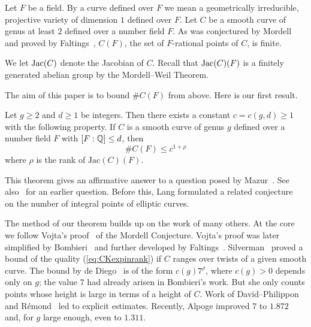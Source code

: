 Let $F$ be a field. By a curve defined over $F$ we mean a geometrically
irreducible, projective variety of dimension $1$ defined over $F$. Let $C$ be
a smooth curve of genus at least $2$ defined over a number field $F$. As was
conjectured by Mordell and proved by Faltings~\cite{Faltings:ES},
$C(F)$, the set of $F$-rational points of $C$, is finite.

We let $\mathrm{Jac}(C)$ denote the Jacobian of $C$. Recall
that $\mathrm{Jac}(C)(F)$ is a finitely generated abelian group by the
Mordell--Weil Theorem. 

The aim of this paper is to bound $\# C(F)$ from above. Here is our
first result. 

\begin{theorem}\label{ThmBdRatIntro}
  Let $g \ge 2$ and $d \ge 1$ be integers. Then there exists a constant
  $c = c(g, d) \ge 1$ with the following property. If $C$ is a smooth curve
  of genus $g$  defined
  over a number field $F$  with $[F:{\mathbb{Q}}] \le d$, then
  \begin{equation}
    \label{eq:CKexpinrank}
      \#C(F) \le c^{1+\rho}
  \end{equation}
  where $\rho$ is the rank of  $\mathrm{Jac}(C)(F)$.%
\end{theorem}

This theorem gives an affirmative answer to a question posed by
Mazur~\cite[Page~223]{Mazur:00}.
See also~\cite[top of
page 234]{mazur1986arithmetic} for an earlier question. Before this,
 Lang formulated a related  conjecture~\cite[page
 140]{Lang:EllipticCurves78} on the number of integral
points of elliptic curves.

The method of our theorem builds up on the work of many others. At the
core we follow Vojta's proof~\cite{Vojta:siegelcompact} of the
Mordell Conjecture.
Vojta's proof was later simplified  by
Bombieri~\cite{Bombieri:Mordell} and further developed by
Faltings~\cite{Faltings:DAAV}. Silverman~\cite{Silverman:twists}
proved a bound of the quality (\ref{eq:CKexpinrank}) if $C$ ranges
over twists of a given smooth curve. 
The bound by de
Diego~\cite{deDiego:97} %
is of the form $c(g)
7^{\rho}$, where $c(g)>0$ depends only on $g$; the value $7$ had already
arisen in Bombieri's work. But she only counts points
whose height is large in terms of a height of $C$.
Work of David--Philippon \cite{DPvarabII} and R\'emond~\cite{Remond:Decompte}
led to explicit estimates. 
Recently, Alpoge \cite{AlpogeRatPt} \cite[Theorem~6.1.1]{AlpogeThesis} improved  $7$
to $1.872$ and, for $g$ large enough, even to $1.311$. 

